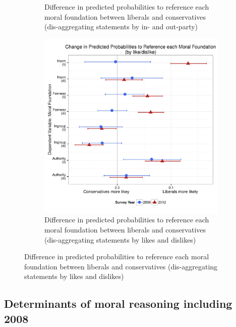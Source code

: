 \documentclass[12pt]{article}
\begin{document}
\begin{figure}[h]
\begin{subfigure}[t]{0.49\textwidth}
\caption{Difference in predicted probabilities to reference each moral foundation between liberals and conservatives (dis-aggregating statements by in- and out-party)}\label{fig:appD5inout}
  \end{subfigure}
  \begin{subfigure}[t]{0.49\textwidth}
    \includegraphics[scale=.35]{../calc/fig/appD6lidi.pdf}
\caption{Difference in predicted probabilities to reference each moral foundation between liberals and conservatives (dis-aggregating statements by likes and dislikes)}\label{fig:appD6lidi}
  \end{subfigure}
\end{figure}


\clearpage
\subsection{Determinants of moral reasoning including 2008}
\end{document}
